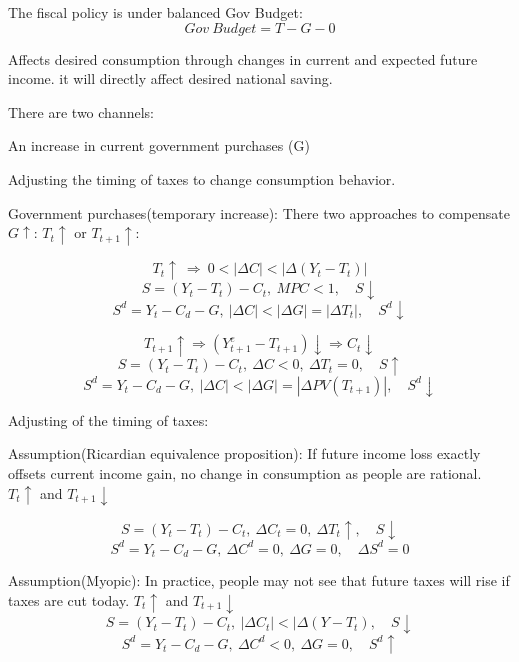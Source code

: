 \documentclass[10pt, a4paper]{article}
\begin{document}
                    The fiscal policy is under balanced Gov Budget:
                    $$Gov\ Budget = T - G - 0$$

                    Affects desired consumption through changes in current and expected future income. it will directly affect desired national saving. 
                    
                    There are two channels: 
                    
                    \quad An increase in current government purchases (G) 

                    \quad Adjusting the timing of taxes to change consumption behavior.

                    Government purchases(temporary increase): There two approaches to compensate $G \uparrow$: $T_t \uparrow$ or $T_{t+1} \uparrow$:
                    
                    $$T_t\uparrow \  \Rightarrow \  0 < |\Delta C| < |\Delta (Y_t - T_t)|$$
                        $$S = (Y_t - T_t) - C_t,\ MPC < 1, \quad  S\downarrow$$
                        $$S^d = Y_t - C_d - G,\ |\Delta C| < |\Delta G| = |\Delta T_t|,\quad S^d\downarrow$$


                    $$T_{t+1}\uparrow \Rightarrow (Y_{t+1}^e - T_{t+1})\downarrow \Rightarrow C_t \downarrow$$
                    $$S = (Y_t - T_t) - C_t,\ \Delta C < 0,\ \Delta T_t = 0, \quad   S\uparrow$$
                    $$S^d = Y_t - C_d - G,\ |\Delta C| < |\Delta G| = |\Delta PV(T_{t+1})|,\quad S^d\downarrow$$

                    Adjusting of the timing of taxes: 

                    \quad Assumption(Ricardian equivalence proposition): If future income loss exactly offsets current income gain, no change in consumption as people are rational. $T_t \uparrow$ and $T_{t+1} \downarrow$ 

                    $$S = (Y_t - T_t) - C_t,\ \Delta C_t = 0,\ \Delta T_t \uparrow,\quad  S \downarrow$$
                    $$S^d = Y_t - C_d - G,\ \Delta C^d = 0,\ \Delta G = 0, \quad \Delta S^d = 0$$

                    \quad Assumption(Myopic): In practice, people may  not see that future taxes will rise if taxes are cut today. $T_t \uparrow$ and $T_{t+1} \downarrow$ 
                    $$S = (Y_t - T_t) - C_t,\ |\Delta C_t| < |\Delta (Y - T_t),\quad S\downarrow$$
                    $$S^d = Y_t - C_d - G,\ \Delta C^d < 0,\ \Delta G = 0, \quad S^d\uparrow$$
\end{document}
